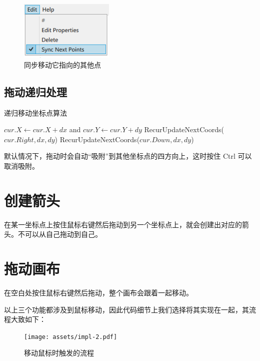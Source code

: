 \begin{figure}[H]
  \centering
  \includegraphics[width=0.4\textwidth]{assets/sync.png}
  \caption{同步移动它指向的其他点}
  \label{fig:sync}
\end{figure}

\subsection{拖动递归处理}

\begin{algorithm}[H]
  \caption{递归移动坐标点算法}
  \begin{algorithmic}[1]
    \State $cur.X \gets cur.X + dx$ and $cur.Y \gets cur.Y + dy$
      \State RecurUpdateNextCoords($cur.Right, dx, dy$)
    \EndIf
      \State RecurUpdateNextCoords($cur.Down, dx, dy$)
    \EndIf
    \EndProcedure
  \end{algorithmic}
\end{algorithm}

默认情况下，拖动时会自动``吸附''到其他坐标点的四方向上，这时按住 Ctrl 可以取消吸附。

\section{创建箭头}

在某一坐标点上按住鼠标右键然后拖动到另一个坐标点上，就会创建出对应的箭头。不可以从自己拖动到自己。

\section{拖动画布}

在空白处按住鼠标右键然后拖动，整个画布会跟着一起移动。

以上三个功能都涉及到鼠标移动，因此代码细节上我们选择将其实现在一起，其流程大致如下：

\begin{figure}[H]
    \centering
    \texttt{[image: assets/impl-2.pdf]}
    \caption{移动鼠标时触发的流程}
    \label{fig:impl-2}
\end{figure}


